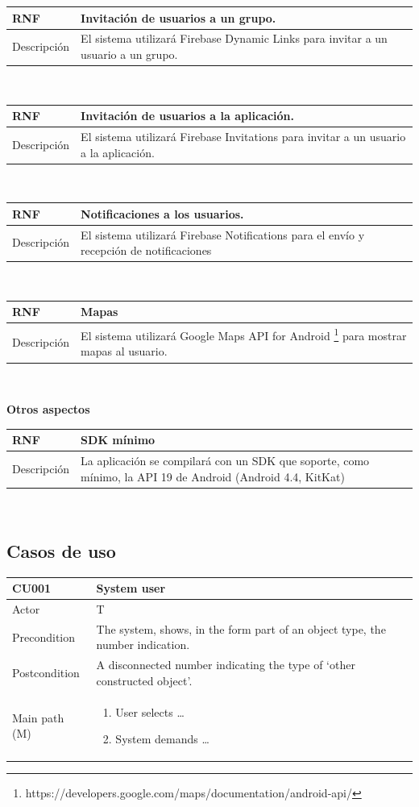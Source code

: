 \documentclass[twoside]{report}
\newcommand\addrow[2]{#1 &#2\\ }
\newcommand\addheading[2]{#1 &#2\\ \hline}
\newcommand\tabularhead{\begin{tabular}{lp{0.7\textwidth}}
\hline
}
\newcommand\addmulrow[2]{ \begin{minipage}[t][][t]{2.5cm}#1\end{minipage}%
   &\begin{minipage}[t][][t]{8cm}
    \begin{enumerate} #2   \end{enumerate}
    \end{minipage}\\ }
\newenvironment{usecase}{\tabularhead}
{\hline\end{tabular}}
\newenvironment{req}{\tabularhead}
{\hline\end{tabular}}
\begin{document}
\begin{req}
	\addheading{\textbf{RNF\arabic{nonFunctionalRequirements}}}{Invitación de usuarios a un grupo.}
	\addrow{Descripción}{El sistema utilizará Firebase Dynamic Links para invitar a un usuario a un grupo.}
\end{req}\\

\begin{req}
	\addheading{\textbf{RNF\arabic{nonFunctionalRequirements}}}{Invitación de usuarios a la aplicación.}
	\addrow{Descripción}{El sistema utilizará Firebase Invitations para invitar a un usuario a la aplicación.}
\end{req}\\

\begin{req}
	\addheading{\textbf{RNF\arabic{nonFunctionalRequirements}}}{Notificaciones a los usuarios.}
	\addrow{Descripción}{El sistema utilizará Firebase Notifications para el envío y recepción de notificaciones}
\end{req}\\

\begin{req}
	\addheading{\textbf{RNF\arabic{nonFunctionalRequirements}}}{Mapas}
	\addrow{Descripción}{El sistema utilizará Google Maps API for Android \footnote{https://developers.google.com/maps/documentation/android-api/} para mostrar mapas al usuario.}
\end{req}\\

\textbf{Otros aspectos}\\

\begin{req}
	\addheading{\textbf{RNF\arabic{nonFunctionalRequirements}}}{SDK mínimo}
	\addrow{Descripción}{La aplicación se compilará con un SDK que soporte, como mínimo, la API 19 de Android (Android 4.4, KitKat)\cite{androidversiondist}}
\end{req}\\

\subsection{Casos de uso}
\begin{usecase}
  \addheading{CU001}{System user} 
  \addrow{Actor}{T}
  \addrow{Precondition}{The system, shows, in the form part of an object type, the number indication.}
  \addrow{Postcondition}{A disconnected number indicating the type of `other constructed object'.}
  \addmulrow{Main path (M)}{
  							\item User selects \ldots
                            \item System demands \ldots
  }
\end{usecase}
\end{document}
